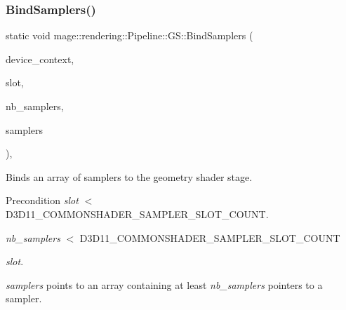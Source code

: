 \subsubsection{\texorpdfstring{Bind\+Samplers()}{BindSamplers()}}
{\footnotesize\ttfamily static void mage\+::rendering\+::\+Pipeline\+::\+G\+S\+::\+Bind\+Samplers (\begin{DoxyParamCaption}\item[{I\+D3\+D11\+Device\+Context \&}]{device\+\_\+context,  }\item[{\mbox{\hyperlink{namespacemage_aa5d6eaabaac3cdd01873d6a3d27e90f3}{U32}}}]{slot,  }\item[{\mbox{\hyperlink{namespacemage_aa5d6eaabaac3cdd01873d6a3d27e90f3}{U32}}}]{nb\+\_\+samplers,  }\item[{I\+D3\+D11\+Sampler\+State $\ast$const $\ast$}]{samplers }\end{DoxyParamCaption})\hspace{0.3cm}{\ttfamily [static]}, {\ttfamily [noexcept]}}

Binds an array of samplers to the geometry shader stage.

\begin{DoxyPrecond}{Precondition}
{\itshape slot} $<$ {\ttfamily D3\+D11\+\_\+\+C\+O\+M\+M\+O\+N\+S\+H\+A\+D\+E\+R\+\_\+\+S\+A\+M\+P\+L\+E\+R\+\_\+\+S\+L\+O\+T\+\_\+\+C\+O\+U\+NT}. 

{\itshape nb\+\_\+samplers} $<$ {\ttfamily D3\+D11\+\_\+\+C\+O\+M\+M\+O\+N\+S\+H\+A\+D\+E\+R\+\_\+\+S\+A\+M\+P\+L\+E\+R\+\_\+\+S\+L\+O\+T\+\_\+\+C\+O\+U\+NT} 
\begin{DoxyItemize}
\item {\itshape slot}. 
\end{DoxyItemize}

{\itshape samplers} points to an array containing at least {\itshape nb\+\_\+samplers} pointers to a sampler. 
\end{DoxyPrecond}

